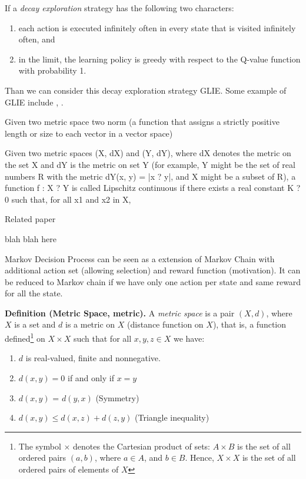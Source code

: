 \documentclass[9pt]{article}
\begin{document}
If a \textit{decay exploration} strategy has the following two characters:
\begin{enumerate}
\item each action is executed infinitely often in every state that is visited infinitely often, and
\item in the limit, the learning policy is greedy with respect to the Q-value function with probability 1.
\end{enumerate}
Than we can consider this decay exploration strategy GLIE. Some example of GLIE include , .


  Given two metric space two norm (a function that assigns  a strictly positive length or size to each vector in a vector space)

Given two metric spaces (X, dX) and (Y, dY), where dX denotes the metric on the set X and dY is the metric on set Y (for example, Y might be the set of real numbers R with the metric dY(x, y) = |x ? y|, and X might be a subset of R), a function f : X ? Y is called Lipschitz continuous if there exists a real constant K ? 0 such that, for all x1 and x2 in X,

\citep{Eriksson2013Applied}

 \Working

Related paper


blah blah here

Markov Decision Process can be seen as a extension of Markov Chain with additional action set (allowing selection) and reward function (motivation). It can be reduced to Markov chain if we have only one action per state and same reward for all the state.

 \Working

\textbf{Definition (Metric Space, metric).} A \textit{metric space} is a pair $(X,d)$, where $X$ is a set and $d$ is a metric on $X$ (distance function on $X$), that is, a function defined\footnote[1]{The symbol $\times$ denotes the Cartesian product of sets: $A \times B$ is the set of all ordered pairs $(a,b)$, where $a \in A$, and $b \in B$. Hence, $X \times X$ is the set of all ordered pairs of elements of $X$} on $X \times X$ such that for all $x,y,z \in X$ we have:
\begin{enumerate}
\item $d$ is real-valued, finite and nonnegative.
\item $d(x,y) = 0$ if and only if $x=y$
\item $d(x,y)$ = $d(y,x)$  (Symmetry)
\item $d(x,y) \le d(x,z) + d(z,y)$   (Triangle inequality)
\end{enumerate}
\end{document}
